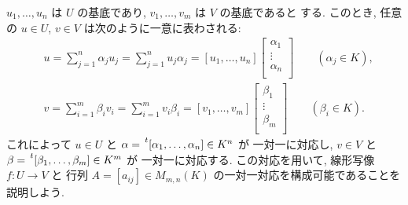 \documentclass[12pt,twoside]{jarticle}
\begin{document}
$u_1,\ldots,u_n$ は $U$ の基底であり, $v_1,\ldots,v_m$ は $V$ の基底であると
する. このとき, 任意の $u\in U$, $v\in V$ は次のように一意に表わされる:
\begin{align*}
  &
  u 
  = \sum_{j=1}^n \alpha_j u_j 
  = \sum_{j=1}^n u_j \alpha_j
  =
  [u_1,\ldots,u_n]
  \begin{bmatrix}
    \alpha_1 \\
    \vdots \\
    \alpha_n \\
  \end{bmatrix}
  \qquad (\alpha_j\in K),
  \\ &
  v
  = \sum_{i=1}^m \beta_i v_i 
  = \sum_{i=1}^m v_i \beta_i 
  =
  [v_1,\ldots,v_m]
  \begin{bmatrix}
    \beta_1 \\
    \vdots \\
    \beta_m \\
  \end{bmatrix}
  \qquad (\beta_i\in K).
\end{align*}
これによって $u\in U$ と $\alpha=\tp{[\alpha_1,\ldots,\alpha_n]}\in K^n$ が
一対一に対応し, $v\in V$ と $\beta=\tp{[\beta_1,\ldots,\beta_m]}\in K^m$ が
一対一に対応する.
この対応を用いて, 線形写像 $f:U\to V$ と
行列 $A=[a_{ij}]\in M_{m,n}(K)$ の一対一対応を構成可能であることを
説明しよう.
\end{document}
